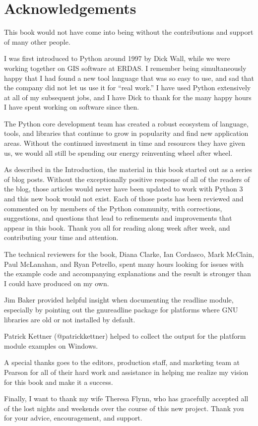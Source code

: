 \cleardoublepage
\chapter*{Acknowledgements}

\noindent This book would not have come into being without the contributions and
support of many other people.

I was first introduced to Python around 1997 by Dick Wall, while we
were working together on GIS software at ERDAS. I remember being
simultaneously happy that I had found a new tool language that was so
easy to use, and sad that the company did not let us use it for ``real
work.'' I have used Python extensively at all of my subsequent jobs,
and I have Dick to thank for the many happy hours I have spent working
on software since then.

The Python core development team has created a robust ecosystem of
language, tools, and libraries that continue to grow in popularity and
find new application areas. Without the continued investment in time
and resources they have given us, we would all still be spending our
energy reinventing wheel after wheel.

As described in the Introduction, the material in this book started
out as a series of blog posts. Without the exceptionally positive
response of all of the readers of the blog, those articles would never
have been updated to work with Python 3 and this new book would not
exist. Each of those posts has been reviewed and commented on by
members of the Python community, with corrections, suggestions, and
questions that lead to refinements and improvements that appear in
this book. Thank you all for reading along week after week, and
contributing your time and attention.

The technical reviewers for the book, Diana Clarke, Ian Cordasco, Mark
McClain, Paul McLanahan, and Ryan Petrello, spent many hours looking
for issues with the example code and accompanying explanations and the
result is stronger than I could have produced on my own.

Jim Baker provided helpful insight when documenting the readline
module, especially by pointing out the gnureadline package for
platforms where GNU libraries are old or not installed by default.

Patrick Kettner (@patrickkettner) helped to collect the output for the
platform module examples on Windows.

A special thanks goes to the editors, production staff, and marketing
team at Pearson for all of their hard work and assistance in helping
me realize my vision for this book and make it a success.

Finally, I want to thank my wife Theresa Flynn, who has gracefully
accepted all of the lost nights and weekends over the course of this
new project. Thank you for your advice, encouragement, and support.
